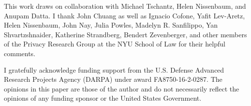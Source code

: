 \documentclass[../thesis.tex]{subfiles}
\begin{document}
This work draws on collaboration with Michael Tschantz,
Helen Nissenbaum, and Anupam Datta.
I thank John Chuang as well as Ignacio Cofone, Yafit Lev-Aretz,
Helen Nissenbaum, John Nay, Julia Powles,
Madelyn R. Sanfilippo, Yan Shvartzshnaider, Katherine
Strandberg, Bendert Zevenberger,  
and other members of the Privacy Research Group at
the NYU School of Law for their helpful comments.

I gratefully acknowledge funding support 
from the U.S. Defense Advanced Research Projects Agency (DARPA) under
award FA8750-16-2-0287.
The opinions in this paper are those of the author and do not
necessarily reflect the opinions of any funding sponsor or the United
States Government.
 
\end{document}
